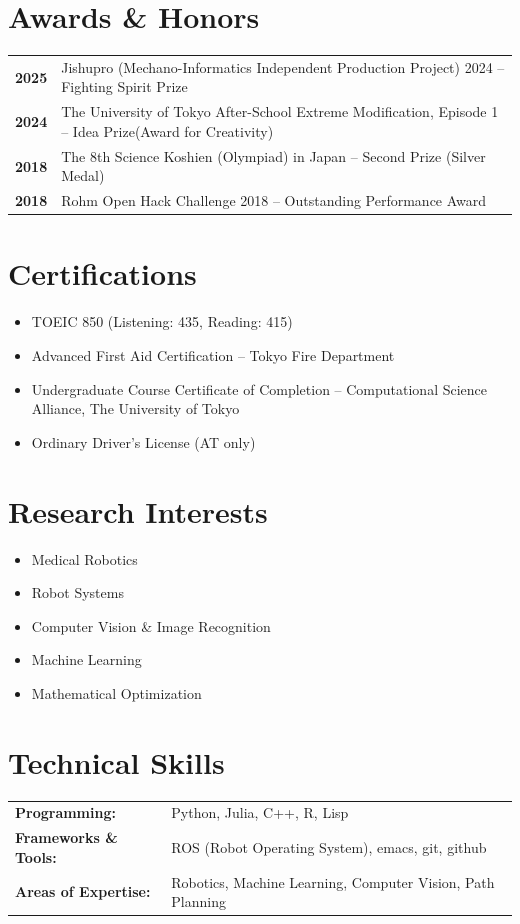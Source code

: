 \documentclass[11pt,a4paper]{article}
\newcommand{\cvitem}[2]{\textbf{#1} & #2 \\[0.3em]}
\begin{document}
\section{Awards \& Honors}
\begin{tabularx}{\textwidth}{@{}p{2.5cm}X@{}}
  \cvitem{2025}{Jishupro (Mechano-Informatics Independent Production Project) 2024 -- Fighting Spirit Prize}
  \cvitem{2024}{The University of Tokyo After-School Extreme Modification, Episode 1 – Idea Prize(Award for Creativity)}
\cvitem{2018}{The 8th Science Koshien (Olympiad) in Japan -- Second Prize (Silver Medal)}
\cvitem{2018}{Rohm Open Hack Challenge 2018 -- Outstanding Performance Award}
\end{tabularx}

\section{Certifications}
\begin{itemize}[leftmargin=1cm,itemsep=0.4em]
    \item TOEIC 850 (Listening: 435, Reading: 415)
    \item Advanced First Aid Certification – Tokyo Fire Department
    \item Undergraduate Course Certificate of Completion – Computational Science Alliance, The University of Tokyo
    \item Ordinary Driver's License (AT only)
\end{itemize}

\section{Research Interests}
\begin{itemize}[leftmargin=1cm,itemsep=0.2em]
    \item Medical Robotics
    \item Robot Systems
    \item Computer Vision \& Image Recognition
    \item Machine Learning
    \item Mathematical Optimization
\end{itemize}

\section{Technical Skills}
\begin{tabularx}{\textwidth}{@{}p{4cm}X@{}}
\textbf{Programming:} & Python, Julia, C++, R, Lisp \\[0.3em]
\textbf{Frameworks \& Tools:} & ROS (Robot Operating System), emacs, git, github\\[0.3em]
\textbf{Areas of Expertise:} & Robotics, Machine Learning, Computer Vision, Path Planning
\end{tabularx}
\end{document}
